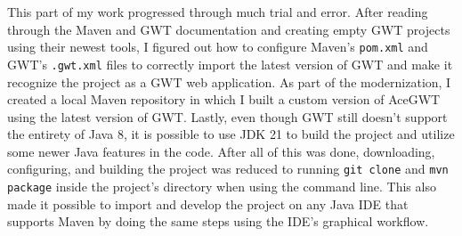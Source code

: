 This part of my work progressed through much trial and error. After reading through the Maven and GWT documentation and creating empty GWT projects using their newest tools, I figured out how to configure Maven's \verb|pom.xml| and GWT's \verb|.gwt.xml| files to correctly import the latest version of GWT and make it recognize the project as a GWT web application. As part of the modernization, I created a local Maven repository in which I built a custom version of AceGWT using the latest version of GWT. Lastly, even though GWT still doesn't support the entirety of Java 8, it is possible to use JDK 21 to build the project and utilize some newer Java features in the code.
\newline
After all of this was done, downloading, configuring, and building the project was reduced to running \verb|git clone| and \verb|mvn package| inside the project's directory when using the command line. This also made it possible to import and develop the project on any Java IDE that supports Maven by doing the same steps using the IDE's graphical workflow.